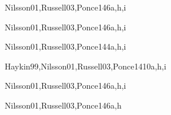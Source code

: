 \begin{syllabus}
\begin{unit}{\ISAdvancedRepresentationandReasoning}{}{Nilsson01,Russell03,Ponce14}{6}{a,h,i}
    \ISAdvancedRepresentationandReasoningAllTopics
    \ISAdvancedRepresentationandReasoningAllLearningOutcomes
\end{unit}

\begin{unit}{\ISAgents}{}{Nilsson01,Russell03,Ponce14}{6}{a,h,i}
    \ISAgentsAllTopics
    \ISAgentsAllLearningOutcomes
\end{unit}

\begin{unit}{\ISNaturalLanguageProcessing}{}{Nilsson01,Russell03,Ponce14}{4}{a,h,i}
    \ISNaturalLanguageProcessingAllTopics
    \ISNaturalLanguageProcessingAllLearningOutcomes
\end{unit}

\begin{unit}{\ISBasicMachineLearning}{}{Haykin99,Nilsson01,Russell03,Ponce14}{10}{a,h,i}
    \ISBasicMachineLearningAllTopics
    \ISBasicMachineLearningAllLearningOutcomes
\end{unit}

\begin{unit}{\ISRobotics}{}{Nilsson01,Russell03,Ponce14}{6}{a,h,i}
    \ISRoboticsAllTopics
    \ISRoboticsAllLearningOutcomes
\end{unit}

\begin{unit}{\ISPerceptionandComputerVision}{}{Nilsson01,Russell03,Ponce14}{6}{a,h}
    \ISPerceptionandComputerVisionAllTopics
    \ISPerceptionandComputerVisionAllLearningOutcomes
\end{unit}

\begin{coursebibliography}
\end{coursebibliography}

\end{syllabus}
    